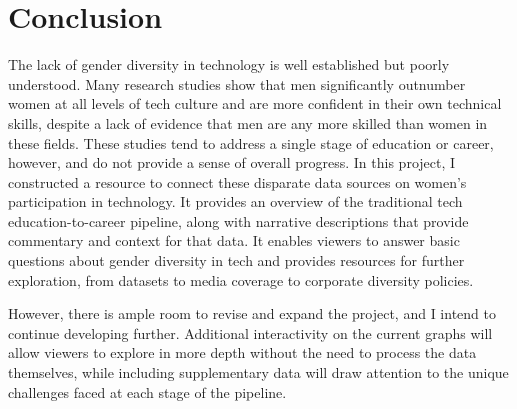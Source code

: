 \section{Conclusion}\label{sec:conclusion}
The lack of gender diversity in technology is well established but poorly understood. Many research studies show that men significantly outnumber women at all levels of tech culture and are more confident in their own technical skills, despite a lack of evidence that men are any more skilled than women in these fields. These studies tend to address a single stage of education or career, however, and do not provide a sense of overall progress. In this project, I constructed a resource to connect these disparate data sources on women's participation in technology. It provides an overview of the traditional tech education-to-career pipeline, along with narrative descriptions that provide commentary and context for that data. It enables viewers to answer basic questions about gender diversity in tech and provides resources for further exploration, from datasets to media coverage to corporate diversity policies.

However, there is ample room to revise and expand the project, and I intend to continue developing further. Additional interactivity on the current graphs will allow viewers to explore in more depth without the need to process the data themselves, while including supplementary data will draw attention to the unique challenges faced at each stage of the pipeline. 
